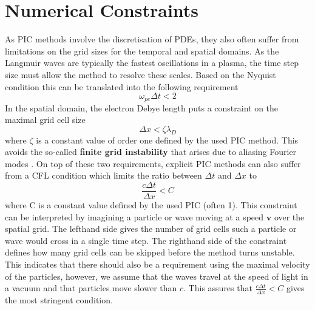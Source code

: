 \section{Numerical Constraints}
As PIC methods involve the discretisation of PDEs, they also often suffer from limitations on the grid sizes for the temporal and spatial domains. As the Langmuir waves are typically the fastest oscillations in a plasma, the time step size must allow the method to resolve these scales. Based on the Nyquist condition this can be translated into the following requirement
\begin{equation}
    \omega_{pe}\Delta t < 2
\end{equation}
In the spatial domain, the electron Debye length puts a constraint on the maximal grid cell size
\begin{equation}
    \Delta x < \zeta \lambda_D
\end{equation}
where $\zeta$ is a constant value of order one defined by the used PIC method. 
This avoids the so-called \textbf{finite grid instability} that arises due to aliasing Fourier modes \cite{giovanni_lapenta_introduction_nodate}. On top of these two requirements, explicit PIC methods can also suffer from a CFL condition which limits the ratio between $\Delta t$ and $\Delta x$ to
\begin{equation}
    \frac{c \Delta t}{\Delta x} < C
\end{equation}
where C is a constant value defined by the used PIC (often 1). 
This constraint can be interpreted by imagining a particle or wave moving at a speed $\textbf{v}$ over the spatial grid. The lefthand side gives the number of grid cells such a particle or wave would cross in a single time step. The righthand side of the constraint defines how many grid cells can be skipped before the method turns unstable. This indicates that there should also be a requirement using the maximal velocity of the particles, however, we assume that the waves travel at the speed of light in a vacuum and that particles move slower than $c$. This assures that $\frac{c \Delta t}{\Delta x} < C$ gives the most stringent condition.

